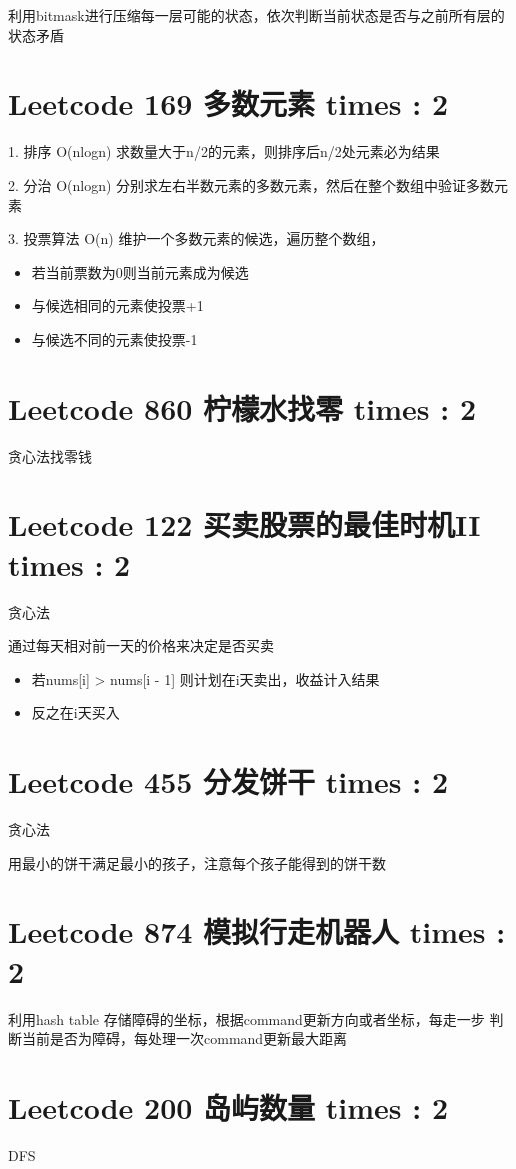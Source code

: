 \documentclass[UTF8]{ctexart}
\begin{document}
利用bitmask进行压缩每一层可能的状态，依次判断当前状态是否与之前所有层的状态矛盾

\section{Leetcode 169 多数元素 times : 2}
1. 排序 O(nlogn)
求数量大于n/2的元素，则排序后n/2处元素必为结果

2. 分治 O(nlogn)
分别求左右半数元素的多数元素，然后在整个数组中验证多数元素

3. 投票算法 O(n)
维护一个多数元素的候选，遍历整个数组，
\begin{itemize}
	\item 若当前票数为0则当前元素成为候选
	\item 与候选相同的元素使投票+1
	\item 与候选不同的元素使投票-1
\end{itemize}

\section{Leetcode 860 柠檬水找零 times : 2}
贪心法找零钱

\section{Leetcode 122 买卖股票的最佳时机II times : 2}
贪心法

通过每天相对前一天的价格来决定是否买卖
\begin{itemize}
	\item 若nums[i] > nums[i - 1] 则计划在i天卖出，收益计入结果
	\item 反之在i天买入
\end{itemize}

\section{Leetcode 455 分发饼干 times : 2}
贪心法

用最小的饼干满足最小的孩子，注意每个孩子能得到的饼干数

\section{Leetcode 874 模拟行走机器人 times : 2}
利用hash table 存储障碍的坐标，根据command更新方向或者坐标，每走一步
判断当前是否为障碍，每处理一次command更新最大距离

\section{Leetcode 200 岛屿数量 times : 2}
DFS
\end{document}
